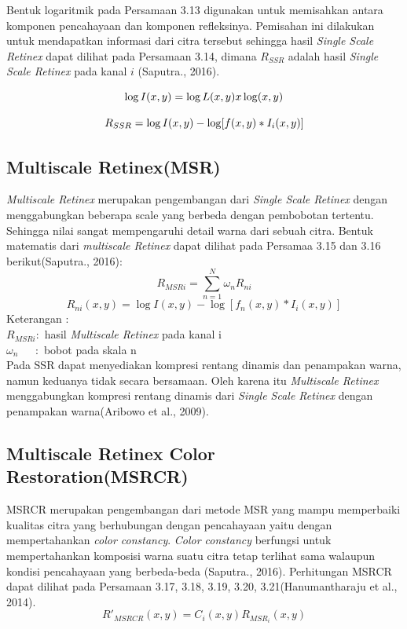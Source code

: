 Bentuk logaritmik pada Persamaan 3.13 digunakan untuk memisahkan antara komponen pencahayaan dan komponen refleksinya. Pemisahan ini dilakukan untuk mendapatkan informasi dari citra tersebut sehingga hasil \emph{Single Scale Retinex} dapat dilihat pada Persamaan 3.14, dimana \(R_{SSR}\) adalah hasil \emph{Single Scale Retinex} pada kanal \(i\) (Saputra., 2016).

\begin{equation}
\centering
	\log I(x,y) = \log L(x,y)  x  \log(x,y)
\end{equation}

\begin{equation}
\centering
R_{SSR} = \log I(x,y) - \log [f(x,y)* I_i(x,y)]
\end{equation}
\subsection{Multiscale Retinex(MSR)}
\emph{Multiscale Retinex} merupakan pengembangan dari \emph{Single Scale Retinex} dengan menggabungkan beberapa scale  yang berbeda dengan pembobotan tertentu. Sehingga nilai  sangat mempengaruhi detail warna dari sebuah citra. Bentuk matematis dari \emph{multiscale Retinex} dapat dilihat pada Persamaa 3.15 dan 3.16 berikut(Saputra., 2016):
\begin{equation}
R_{MSRi} = \sum_{n=1}^{N} \omega_n R_{ni}
\end{equation}
\begin{equation}
R_{ni}(x,y) = \log I(x,y) - \log [f_n(x,y)* I_i(x,y)]
\end{equation}
Keterangan :
\\
\(R_{MSRi} : \) hasil \emph{Multiscale Retinex} pada kanal i
\\
\(\omega_n \ \ \ \ \ \ \ : \) bobot pada skala n\\
Pada SSR dapat menyediakan kompresi rentang dinamis dan penampakan warna, namun keduanya tidak secara bersamaan. Oleh karena itu \emph{Multiscale Retinex} menggabungkan kompresi rentang dinamis dari \emph{Single Scale Retinex} dengan penampakan warna(Aribowo et al., 2009).
\subsection{Multiscale Retinex Color Restoration(MSRCR)}
MSRCR merupakan pengembangan dari metode MSR yang mampu memperbaiki kualitas citra yang berhubungan dengan pencahayaan yaitu dengan mempertahankan \emph{color constancy}. \emph{Color constancy} berfungsi untuk mempertahankan komposisi warna suatu citra tetap terlihat sama walaupun kondisi pencahayaan yang berbeda-beda (Saputra., 2016). Perhitungan MSRCR dapat dilihat pada Persamaan 3.17, 3.18, 3.19, 3.20, 3.21(Hanumantharaju et al., 2014).
\begin{equation}
	R'_{MSRCR}(x,y) = C_i(x,y) R_{MSR_i}(x,y)	
\end{equation}

